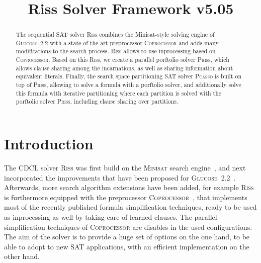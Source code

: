 \documentclass[conference]{IEEEtran}
\begin{document}
	
\title{Riss Solver Framework v5.05}

\author{
}

\maketitle

\def\coprocessor{\textsc{Coprocessor}\xspace}
\def\glucose{\textsc{Glucose~2.2}\xspace}
\def\minisat{\textsc{Minisat~2.2}\xspace}
\def\riss{\textsc{Riss}\xspace}
\def\priss{\textsc{Priss}\xspace}
\def\pcasso{\textsc{Pcasso}\xspace}

\begin{abstract}
The sequential SAT solver \riss combines the Minisat-style solving engine of \glucose with a state-of-the-art preprocessor \textsc{Coprocessor} and adds many modifications to the search process. 
\riss allows to use inprocessing based on \coprocessor.
Based on this \riss, we create a parallel porftolio solver \priss, which allows clause sharing among the incarnations, as well as sharing information about equivalent literals. 
Finally, the search space partitioning SAT solver \pcasso is built on top of \priss, allowing to solve a formula with a porftolio solver, and additionally solve this formula with iterative partitioning where each partition is solved with the porftolio solver \priss, including clause sharing over partitions. 
\end{abstract}

\section{Introduction}

The CDCL solver \riss was first build on the \textsc{Minisat} search engine~\cite{EenS:2003}, and next incorporated the improvements that have been proposed for \glucose ~\cite{AudemardS:2009,Audemard:2012:RRS:2405292.2405308}. 
Afterwards, more search algorithm extensions have been added, for example 
\riss is furthermore equipped with the preprocessor \textsc{Coprocessor}~\cite{Manthey:2012}, 
that implements most of the recently published formula simplification techniques, ready to be used as inprocessing as well by taking care of learned clauses. 
The parallel simplification techniques of \coprocessor are disables in the used configurations. 
The aim of the solver is to provide a huge set of options on the one hand, to be able to adopt to new SAT applications, with an efficient implementation on the other hand. 
\end{document}
